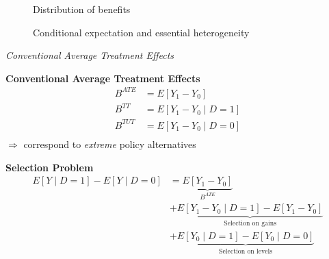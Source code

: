 \begin{frame}
\begin{figure}[htp]\centering\caption{Distribution of benefits}
\end{figure}
\end{frame}
\begin{frame}
	\begin{figure}\caption{Conditional expectation and essential heterogeneity}
	\end{figure}
\end{frame}
\begin{frame}\begin{center}
		\LARGE\textit{Conventional Average Treatment Effects}
\end{center}\end{frame}
\begin{frame}
	\textbf{Conventional Average Treatment Effects}
	\begin{align*}
		B^{ATE} & = E[Y_1 - Y_0 ]\\
		B^{TT} & = E[Y_1 - Y_0 \mid D = 1]\\
		B^{TUT} & = E[Y_1 - Y_0 \mid D = 0]\\
	\end{align*}
	\(\Rightarrow\) correspond to \emph{extreme} policy alternatives
\end{frame}
\begin{frame}
	\textbf{Selection Problem}
	\begin{align*}
		E[Y\mid D = 1] - E[Y\mid D = 0] & = \underbrace{E[Y_1 - Y_0]}_{B^{ATE}} \\
		& + \underbrace{E[Y_1 - Y_0 \mid D = 1] - E[Y_1 - Y_0]}_{\text{Selection on gains}} \\
		& + \underbrace{E[Y_0\mid D = 1] - E[Y_0 \mid D = 0]}_{\text{Selection on levels}}
	\end{align*}
\end{frame}
